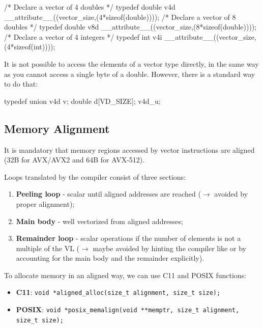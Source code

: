 \begin{codeblock}[language=C]
/* Declare a vector of 4 doubles */
typedef double v4d __attribute__((vector_size,(4*sizeof(double))));
/* Declare a vector of 8 doubles */
typedef double v8d __attribute__((vector_size,(8*sizeof(double))));
/* Declare a vector of 4 integers */
typedef int v4i __attribute__((vector_size,(4*sizeof(int))));
\end{codeblock}

It is not possible to access the elements of a vector type directly, in the same way as you cannot access a single byte of a double. However, there is a standard way to do that:

\begin{codeblock}[language=C]
typedef union {
    v4d v;
    double d[VD_SIZE];
} v4d_u;
\end{codeblock}

\subsection{Memory Alignment}

It is mandatory that memory regions accessed by vector instructions are aligned (32B for AVX/AVX2 and 64B for AVX-512).

Loops translated by the compiler consist of three sections:
\begin{enumerate}
    \item \textbf{Peeling loop} - scalar until aligned addresses are reached ($\to$ avoided by proper alignment);
    \item \textbf{Main body} - well vectorized from aligned addresses;
    \item \textbf{Remainder loop} - scalar operations if the number of elements is not a multiple of the VL ($\to$ maybe avoided by hinting the compiler like  or by accounting for the main body and the remainder explicitly).
\end{enumerate}

To allocate memory in an aligned way, we can use C11 and POSIX functions:

\begin{itemize}
    \item \textbf{C11}:
    \texttt{void *aligned\_alloc(size\_t alignment, size\_t size);}
    \item \textbf{POSIX}:
    \texttt{void *posix\_memalign(void **memptr, size\_t alignment, size\_t size);}
\end{itemize}

